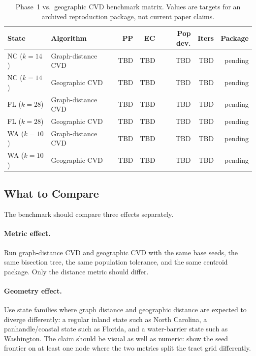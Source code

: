 \begin{table}[t]
\centering
\caption{%
  Phase~1 vs.\ geographic CVD benchmark matrix. Values are targets for an
  archived reproduction package, not current paper claims.
}
\label{tab:main-results}
\renewcommand{\arraystretch}{1.25}
\begin{tabular}{@{}llrrrrr@{}}
\toprule
State & Algorithm & PP & EC & Pop dev. & Iters & Package \\
\midrule
NC ($k=14$) & Graph-distance CVD & TBD & TBD & TBD & TBD & pending \\
NC ($k=14$) & Geographic CVD     & TBD & TBD & TBD & TBD & pending \\
\midrule
FL ($k=28$) & Graph-distance CVD & TBD & TBD & TBD & TBD & pending \\
FL ($k=28$) & Geographic CVD     & TBD & TBD & TBD & TBD & pending \\
\midrule
WA ($k=10$) & Graph-distance CVD & TBD & TBD & TBD & TBD & pending \\
WA ($k=10$) & Geographic CVD     & TBD & TBD & TBD & TBD & pending \\
\bottomrule
\end{tabular}
\end{table}

\subsection{What to Compare}

The benchmark should compare three effects separately.

\paragraph{Metric effect.}
Run graph-distance CVD and geographic CVD with the same base seeds, the same
bisection tree, the same population tolerance, and the same centroid package.
Only the distance metric should differ.

\paragraph{Geometry effect.}
Use state families where graph distance and geographic distance are expected
to diverge differently: a regular inland state such as North Carolina, a
panhandle/coastal state such as Florida, and a water-barrier state such as
Washington. The claim should be visual as well as numeric: show the seed
frontier on at least one node where the two metrics split the tract grid
differently.


